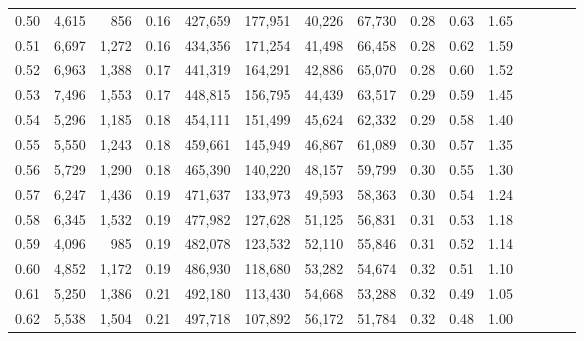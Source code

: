 \begin{tabular}{rrrcrrrrrrrrrrr}
0.50 &   4,615 &    856 &                                       0.16 &  427,659 &  177,951 &   40,226 &   67,730 &  0.28 &  0.63 &                         1.65 \\
0.51 &   6,697 &  1,272 &                                       0.16 &  434,356 &  171,254 &   41,498 &   66,458 &  0.28 &  0.62 &                         1.59 \\
0.52 &   6,963 &  1,388 &                                       0.17 &  441,319 &  164,291 &   42,886 &   65,070 &  0.28 &  0.60 &                         1.52 \\
0.53 &   7,496 &  1,553 &                                       0.17 &  448,815 &  156,795 &   44,439 &   63,517 &  0.29 &  0.59 &                         1.45 \\
0.54 &   5,296 &  1,185 &                                       0.18 &  454,111 &  151,499 &   45,624 &   62,332 &  0.29 &  0.58 &                         1.40 \\
0.55 &   5,550 &  1,243 &                                       0.18 &  459,661 &  145,949 &   46,867 &   61,089 &  0.30 &  0.57 &                         1.35 \\
0.56 &   5,729 &  1,290 &                                       0.18 &  465,390 &  140,220 &   48,157 &   59,799 &  0.30 &  0.55 &                         1.30 \\
0.57 &   6,247 &  1,436 &                                       0.19 &  471,637 &  133,973 &   49,593 &   58,363 &  0.30 &  0.54 &                         1.24 \\
0.58 &   6,345 &  1,532 &                                       0.19 &  477,982 &  127,628 &   51,125 &   56,831 &  0.31 &  0.53 &                         1.18 \\
0.59 &   4,096 &    985 &                                       0.19 &  482,078 &  123,532 &   52,110 &   55,846 &  0.31 &  0.52 &                         1.14 \\
0.60 &   4,852 &  1,172 &                                       0.19 &  486,930 &  118,680 &   53,282 &   54,674 &  0.32 &  0.51 &                         1.10 \\
0.61 &   5,250 &  1,386 &                                       0.21 &  492,180 &  113,430 &   54,668 &   53,288 &  0.32 &  0.49 &                         1.05 \\
0.62 &   5,538 &  1,504 &                                       0.21 &  497,718 &  107,892 &   56,172 &   51,784 &  0.32 &  0.48 &                         1.00 \\

\end{tabular}
